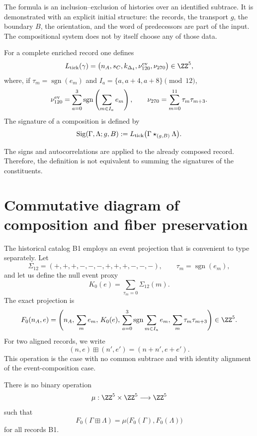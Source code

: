 The formula is an inclusion--exclusion of histories over an identified
subtrace. It is demonstrated with an explicit initial structure: the
records, the transport \(g\), the boundary \(B\), the orientation, and the word
of predecessors are part of the input. The compositional system does not
by itself choose any of those data.

\begin{definition}
\label{def:extractor-posterior-empalme-rev6}
For a complete enriched record one defines
\[
 L_{\rm tick}(\gamma)
 =
 \bigl(
 n_A,s_C,k_{\Delta_4},
 \nu_{120}^{\rm ev},\nu_{270}
 \bigr)\in\ZZ^5,
\]
where, if \(\tau_m=\operatorname{sgn}(e_m)\) and
\(I_a=\{a,a+4,a+8\}\pmod {12}\),
\[
 \nu_{120}^{\rm ev}
 =
 \sum_{a=0}^{3}
 \operatorname{sgn}\left(\sum_{m\in I_a}e_m\right),
 \qquad
 \nu_{270}
 =
 \sum_{m=0}^{11}\tau_m\tau_{m+3}.
\]
The signature of a composition is defined by
\[
 \operatorname{Sig}(\Gamma,\Lambda;g,B)
 :=
 L_{\rm tick}
 \bigl(\Gamma\star_{(g,B)}\Lambda\bigr).
\]
\end{definition}

The signs and autocorrelations are applied to the already composed record.
Therefore, the definition is not equivalent to summing the signatures of the constituents.

\section{Commutative diagram of composition and fiber preservation}
\label{sec:rombo-no-descenso-composicional-rev6}

The historical catalog B1 employs an event projection that is convenient to type separately. Let
\[
 \Sigma_{12}=(+,+,+,-,-,-,+,+,+,-,-,-),
 \qquad \tau_m=\operatorname{sgn}(e_m),
\]
and let us define the null event proxy
\[
 K_0(e)
 =
 \sum_{\tau_m=0}\Sigma_{12}(m).
\]
The exact projection is
\[
 F_0(n_A,e)
 =
 \left(
 n_A,\,
 \sum_m e_m,\,
 K_0(e),\,
 \sum_{a=0}^{3}
   \operatorname{sgn}\sum_{m\in I_a}e_m,\,
 \sum_m\tau_m\tau_{m+3}
 \right)\in\ZZ^5.
\]
For two aligned records, we write
\[
 (n,e)\boxplus(n',e')=(n+n',e+e').
\]
This operation is the case with no common subtrace and with identity alignment of the
event-composition case.

\begin{proposition}
\label{prop:no-descenso-proyeccion-b1-rev6}
There is no binary operation
\[
 \mu:\ZZ^5\times\ZZ^5\longrightarrow\ZZ^5
\]
such that
\[
 F_0(\Gamma\boxplus\Lambda)
 =
 \mu\bigl(F_0(\Gamma),F_0(\Lambda)\bigr)
\]
for all records B1.
\end{proposition}

